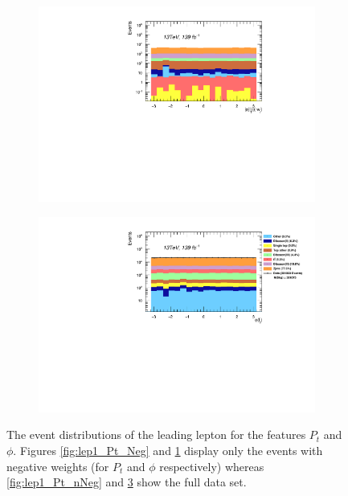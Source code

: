 \begin{figure}
{    \begin{subfigure}{.525\textwidth}
        \includegraphics[width=\textwidth]{Figures/FeaturesHistograms/lep1_Phi_Neg.pdf}
        \vspace{-.75cm}
        \caption{}
        \label{fig:lep1_Phi_Neg}
    \end{subfigure}
    \begin{subfigure}{.525\textwidth}
        \includegraphics[width=\textwidth]{Figures/FeaturesHistograms/lep1_Phi_nNeg.pdf}
        \vspace{-.75cm}
        \caption{}
        \label{fig:lep1_Phi_nNeg}
    \end{subfigure}
    }
    \caption[The event distributions of the leading lepton for the features $P_t$ and $\phi$, for events with negative 
    weights and all events.]{The event distributions of the leading lepton for the features $P_t$ and $\phi$. 
    Figures \ref{fig:lep1_Pt_Neg} and \ref{fig:lep1_Phi_Neg} display only the events with 
    negative weights (for $P_t$ and $\phi$ respectively) whereas \ref{fig:lep1_Pt_nNeg} 
    and \ref{fig:lep1_Phi_nNeg} show the full data set.}
\end{figure}
